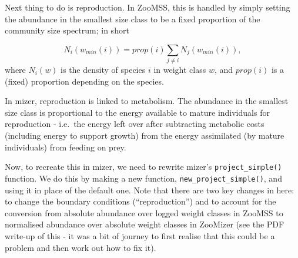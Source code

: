 \documentclass[
]{article}
\begin{document}
Next thing to do is reproduction. In ZooMSS, this is handled by simply
setting the abundance in the smallest size class to be a fixed
proportion of the community size spectrum; in short

\[ N_i(w_{min}(i)) = prop(i) \sum_{j \neq i} N_j(w_{min}(i)),\] where
\(N_i(w)\) is the density of species \(i\) in weight class \(w\), and
\(prop(i)\) is a (fixed) proportion depending on the species.

In mizer, reproduction is linked to metabolism. The abundance in the
smallest size class is proportional to the energy available to mature
individuals for reproduction - i.e.~the energy left over after
subtracting metabolic costs (including energy to support growth) from
the energy assimilated (by mature individuals) from feeding on prey.

Now, to recreate this in mizer, we need to rewrite mizer's
\texttt{project\_simple()} function. We do this by making a new
function, \texttt{new\_project\_simple()}, and using it in place of the
default one. Note that there are two key changes in here: to change the
boundary conditions (``reproduction'') and to account for the conversion
from absolute abundance over logged weight classes in ZooMSS to
normalised abundance over absolute weight classes in ZooMizer (see the
PDF write-up of this - it was a bit of journey to first realise that
this could be a problem and then work out how to fix it).
\end{document}
